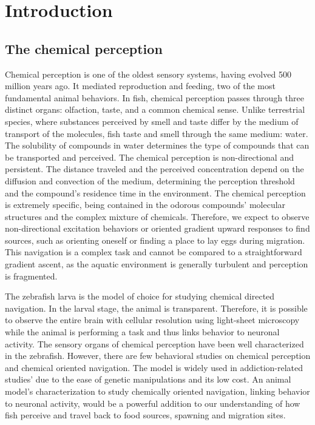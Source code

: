\chapter{Introduction}

  \section{The chemical perception}
  Chemical perception is one of the oldest sensory systems, having evolved 500 million years ago. It mediated reproduction and feeding, two of the most fundamental animal behaviors. In fish, chemical perception passes through three distinct organs: olfaction, taste, and a common chemical sense. Unlike terrestrial species, where substances perceived by smell and taste differ by the medium of transport of the molecules, fish taste and smell through the same medium: water. The solubility of compounds in water determines the type of compounds that can be transported and perceived. The chemical perception is non-directional and persistent. The distance traveled and the perceived concentration depend on the diffusion and convection of the medium, determining the perception threshold and the compound's residence time in the environment. The chemical perception is extremely specific, being contained in the odorous compounds' molecular structures and the complex mixture of chemicals. Therefore, we expect to observe non-directional excitation behaviors or oriented gradient upward responses to find sources, such as orienting oneself or finding a place to lay eggs during migration. This navigation is a complex task and cannot be compared to a straightforward gradient ascent, as the aquatic environment is generally turbulent and perception is fragmented.

  The zebrafish larva is the model of choice for studying chemical directed navigation. In the larval stage, the animal is transparent. Therefore, it is possible to observe the entire brain with cellular resolution using light-sheet microscopy while the animal is performing a task and thus links behavior to neuronal activity. The sensory organs of chemical perception have been well characterized in the zebrafish. However, there are few behavioral studies on chemical perception and chemical oriented navigation. The model is widely used in addiction-related studies' due to the ease of genetic manipulations and its low cost. An animal model's characterization to study chemically oriented navigation, linking behavior to neuronal activity, would be a powerful addition to our understanding of how fish perceive and travel back to food sources, spawning and migration sites.

